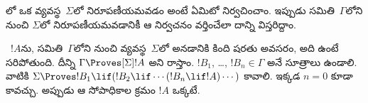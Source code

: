 \documentclass[../../../include/open-logic-section]{subfiles}
\begin{document}


లో ఒక వ్యవస్థ~$\Sigma$లో
 నిరూపణీయమవడం అంటే
ఏమిటో నిర్వచించాం. ఇప్పుడు సమితి~$\Gamma$లోని
 నుంచి $\Sigma$లో
నిరూపణీయమవడానికీ ఆ నిర్వచనం వర్తించేలా దాన్ని విస్తరిద్దాం.

\begin{defn}
  ~$!A$ను, సమితి~$\Gamma$లోని
   నుంచి వ్యవస్థ~$\Sigma$లో
   అనడానికి కింది షరతు అవసరం, అది ఉంటే సరిపోతుంది. దీన్ని
  $\Gamma \Proves[\Sigma] !A$ అని రాస్తాం.
  $!B_1$, \dots, $!B_n \in \Gamma$
  అనే సూత్రాలు ఉండాలి. వాటికి $\Sigma \Proves !B_1 \lif (!B_2 \lif \cdots (!B_n \lif !A)
  \cdots)$ కావాలి. ఇక్కడ $n=0$ కూడా కావచ్చు. అప్పుడు ఆ సోపాధికాల క్రమం $!A$ ఒక్కటే.
\end{defn}
\end{document}
